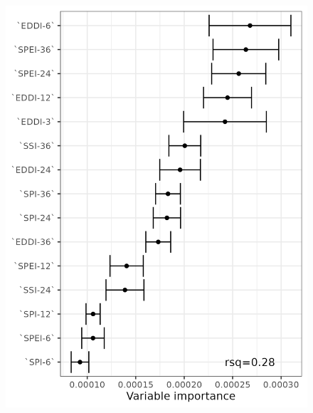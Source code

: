 \documentclass[
  authoryear,
  preprint,
  3p,
  onecolumn]{elsarticle}
\begin{document}
\begin{figure}[!ht]
\begin{minipage}{0.33\linewidth}
{\includegraphics[width=1\textwidth,height=\textheight]{figs/fig_errorbar_resample_random_forest_trends_Grassland_norte grande.png}

}


\end{minipage}%
\newline
\begin{minipage}{0.33\linewidth}

\centering{

}
\end{minipage}
\end{figure}
\end{document}
